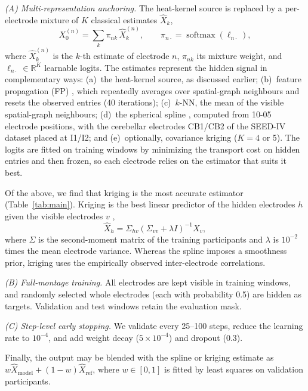 \documentclass{article}
\begin{document}
\emph{(A) Multi-representation anchoring.} The heat-kernel source is
replaced by a per-electrode mixture of $K$ classical estimates $\hat X_k$,
\begin{equation}
X_0^{(n)}=\textstyle\sum_k \pi_{nk}\,\hat X_k^{(n)},\qquad
\pi_{n\cdot}=\operatorname{softmax}(\ell_{n\cdot}),
\end{equation}
where $\hat X_k^{(n)}$ is the $k$-th estimate of electrode $n$, $\pi_{nk}$
its mixture weight, and $\ell_{n\cdot}\in\mathbb{R}^K$ learnable logits.
The estimates represent the hidden signal in complementary ways:
(a)~the heat-kernel source, as discussed earlier; (b)~feature propagation
(FP) \cite{rossi2022unreasonable}, which repeatedly averages over
spatial-graph neighbours and resets the observed entries (40 iterations);
(c)~$k$-NN, the mean of the visible spatial-graph neighbours; (d)~the
spherical spline \cite{perrin1989spherical}, computed from 10-05 electrode
positions, with the cerebellar electrodes CB1/CB2 of the SEED-IV dataset
placed at I1/I2; and (e)~optionally, covariance kriging ($K=4$ or 5). The
logits are fitted on training windows by minimizing the transport cost on
hidden entries and then frozen, so each electrode relies on the estimator
that suits it best.

Of the above, we find that kriging is the most accurate estimator
(Table~\ref{tab:main}). Kriging is the best linear predictor of the hidden
electrodes $h$ given the visible electrodes $v$ \cite{cressie1993statistics},
\begin{equation}
\label{eq:kriging}
\hat X_h=\Sigma_{hv}(\Sigma_{vv}+\lambda I)^{-1}X_v,
\end{equation}
where $\Sigma$ is the second-moment matrix of the training participants
and $\lambda$ is $10^{-2}$ times the mean electrode variance. Whereas the
spline imposes a smoothness prior, kriging uses the empirically observed
inter-electrode correlations.

\emph{(B) Full-montage training.} All electrodes are kept visible in
training windows, and randomly selected whole electrodes (each with
probability 0.5) are hidden as targets. Validation and test windows retain
the evaluation mask.

\emph{(C) Step-level early stopping.} We validate every 25--100 steps,
reduce the learning rate to $10^{-4}$, and add weight decay
($5\times10^{-4}$) and dropout (0.3).

Finally, the output may be blended with the spline or kriging estimate as
$w\hat X_{\mathrm{model}}+(1-w)\hat X_{\mathrm{ref}}$, where $w\in[0,1]$
is fitted by least squares on validation participants.
\end{document}
